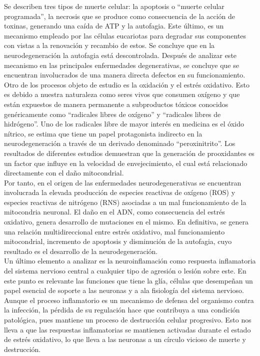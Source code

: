 \documentclass[12pt]{article}
\begin{document}
	Se describen tres tipos de muerte celular: la apoptosis o “muerte celular programada”, la necrosis que se produce como consecuencia de la acción de toxinas, generando una caída de ATP y la autofagia. Este último, es un mecanismo empleado por las células eucariotas para degradar sus componentes con vistas a la renovación y recambio de estos. Se concluye que en la neurodegeneración la autofagia está descontrolada. Después de analizar este mecanismo en las principales enfermedades degenerativas, se concluye que se encuentran involucrados de una manera directa defectos en su funcionamiento.\\
	
	Otro de los procesos objeto de estudio es la oxidación y el estrés oxidativo. Esto es debido a nuestra naturaleza como seres vivos que consumen oxígeno y que están expuestos de manera permanente a subproductos tóxicos conocidos genéricamente como  “radicales libres de oxígeno” y “radicales libres de hidrógeno”. Uno de los radicales libre de mayor interés en medicina es el óxido nítrico, se estima que tiene un papel protagonista indirecto en la neurodegeneración a través de un derivado denominado “peroxinitrito”. Los resultados de diferentes estudios demuestran que la generación de prooxidantes es un factor que influye en la velocidad de envejecimiento, el cual está relacionado directamente con el daño mitocondrial.\\
	
	Por tanto, en el origen de las enfermedades neurodegenerativas se encuentran involucrada la elevada producción de especies reactivas de oxígeno (ROS) y especies reactivas de nitrógeno (RNS) asociadas a un mal funcionamiento de la mitocondria neuronal. El daño en el ADN, como consecuencia del estrés oxidativo, genera desarrollo de mutaciones en el mismo. En definitiva, se genera una relación multidireccional entre estrés oxidativo, mal funcionamiento mitocondrial, incremento de apoptosis y disminución de la autofagia, cuyo resultado es el desarrollo de la neurodegeneración.\\
	
	Un último elemento a analizar es la neuroinflamación como respuesta inflamatoria del sistema nervioso central a cualquier tipo de agresión o lesión sobre este. En este punto es relevante las funciones que tiene la glía, células que desempeñan un papel esencial de soporte a las neuronas y a ala fisiología del sistema nervioso. Aunque el proceso inflamatorio es un mecanismo de defensa del organismo contra la infección, la pérdida de su regulación hace que contribuya a una condición patológica, pues mantiene un proceso de destrucción celular progresivo. Esto nos lleva a que las respuestas inflamatorias se mantienen activadas durante el estado de estrés oxidativo, lo que lleva a las neuronas a un círculo vicioso de muerte y destrucción.	
	
\end{document}
